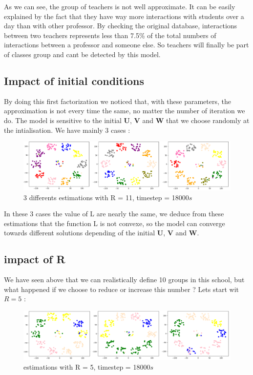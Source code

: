 \documentclass{article}
\begin{document}
As we can see, the group of teachers is not well approximate. It can be easily explained by the fact that they have way more 
interactions with students over a day than with other professor. By checking the original database, interactions between two teachers 
represents less than 7.5\% of the total numbers of interactions between a professor and someone else. 
So teachers will finally be part of classes group and cant be detected by this model.\\

\subsection{Impact of initial conditions}
By doing this first factorization we noticed that, with these parameters, the approximation is not every time the same, 
no matter the number of iteration we do. The model is sensitive to the initial $\mathbf{U}$, $\mathbf{V}$ and $\mathbf{W}$ that we
choose randomly at the intialisation. We have mainly 3 cases :

\begin{figure}[H]
    \centering
    \includegraphics[width=1\textwidth]{images/3cases_of_convergence.png}
    \caption{3 differents estimations with R = 11, timestep = 18000$s$}
\end{figure}

In these 3 cases the value of L are nearly the same, we deduce from these estimations that the function L is not convexe, so the model can converge 
towards different solutions depending of the initial $\mathbf{U}$, $\mathbf{V}$ and $\mathbf{W}$.

\subsection{impact of R}

We have seen above that we can realistically define 10 groups in this school, but what happened if we choose to reduce or increase this number ?
Lets start wit $R = 5$ :\\

\begin{figure}[H]
    \centering
    \includegraphics[width=1\textwidth]{images/R=5_t=18000.png}
    \caption{estimations with R = 5, timestep = 18000$s$}
\end{figure}
\end{document}
